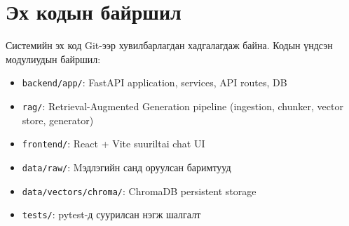
\section{Эх кодын байршил}

Системийн эх код Git-ээр хувилбарлагдан хадгалагдаж байна. Кодын үндсэн модулиудын байршил:

\begin{itemize}
    \item \texttt{backend/app/}: FastAPI application, services, API routes, DB
    \item \texttt{rag/}: Retrieval-Augmented Generation pipeline (ingestion, chunker, vector store, generator)
    \item \texttt{frontend/}: React + Vite suuriltai chat UI
    \item \texttt{data/raw/}: Mэдлэгийн санд оруулсан баримтууд
    \item \texttt{data/vectors/chroma/}: ChromaDB persistent storage
    \item \texttt{tests/}: pytest-д суурилсан нэгж шалгалт
\end{itemize}
